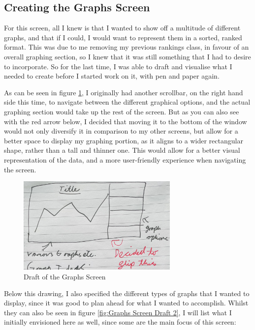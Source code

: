 \documentclass{article}
\begin{document}
\subsection{Creating the Graphs Screen}
For this screen, all I knew is that I wanted to show off a multitude of different graphs, and that if I could, I would want to represent them in a sorted, ranked format. This was due to me removing my previous rankings class, in favour of an overall graphing section, so I knew that it was still something that I had to desire to incorporate. So for the last time, I was able to draft and visualise what I needed to create before I started work on it, with pen and paper again.\\\vspace{0.3cm}

As can be seen in figure \ref{fig:Graphs Screen Draft}, I originally had another scrollbar, on the right hand side this time, to navigate between the different graphical options, and the actual graphing section would take up the rest of the screen. But as you can also see with the red arrow below, I decided that moving it to the bottom of the window would not only diversify it in comparison to my other screens, but allow for a better space to display my graphing portion, as it aligns to a wider rectangular shape, rather than a tall and thinner one. This would allow for a better visual representation of the data, and a more user-friendly experience when navigating the screen.\\\vspace{0.3cm}

\begin{figure}[h]
  \centering
  \includegraphics[width=0.7\textwidth]{Images/Term 2 Images/IMG_1349.jpg}
  \caption{Draft of the Graphs Screen}
  \label{fig:Graphs Screen Draft}
\end{figure}

\newpage
Below this drawing, I also specified the different types of graphs that I wanted to display, since it was good to plan ahead for what I wanted to accomplish. Whilst they can also be seen in figure \ref{fig:Graphs Screen Draft 2}, I will list what I initially envisioned here as well, since some are the main focus of this screen:
\end{document}
